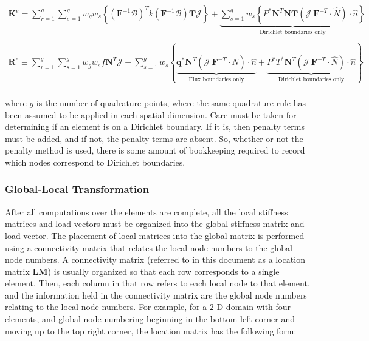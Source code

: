 \documentclass[10pt]{article}
\begin{document}
\begin{equation}
\label{eq:FEWeakForm_element3}
\begin{aligned}
\textbf{K}^e=\sum_{r=1}^g\sum_{s=1}^gw_gw_s\left\{(\textbf{F}^{-1}\mathscr{B})^Tk(\textbf{F}^{-1}\mathscr{B})\textbf{T} \mathscr{J}\right\} +\underbrace{\sum_{s=1}^gw_s\left\{P^{*}\textbf{N}^T\textbf{N}\textbf{T}(\mathscr{J}\ \textbf{F}^{-T}\cdot\hat{N})\cdot\hat{n}\right\}}_\text{Dirichlet boundaries only}\\
\ \\
\textbf{R}^e\equiv\sum_{r=1}^g\sum_{s=1}^gw_gw_sf\textbf{N}^T \mathscr{J}+\sum_{s=1}^gw_s\left\{\underbrace{\textbf{q}^{*}\textbf{N}^T (\mathscr{J}\ \textbf{F}^{-T}\cdot\hat{N})\cdot\hat{n}}_\text{Flux boundaries only}+\underbrace{P^{*}T^{*}\textbf{N}^T (\mathscr{J}\ \textbf{F}^{-T}\cdot\hat{N})\cdot\hat{n}}_\text{Dirichlet boundaries only}\right\}\\
\end{aligned}
\end{equation}

where \(g\) is the number of quadrature points, where the same quadrature rule has been assumed to be applied in each spatial dimension. Care must be taken for determining if an element is on a Dirichlet boundary. If it is, then penalty terms must be added, and if not, the penalty terms are absent. So, whether or not the penalty method is used, there is some amount of bookkeeping required to record which nodes correspond to Dirichlet boundaries.

\subsubsection{Global-Local Transformation}

After all computations over the elements are complete, all the local stiffness matrices and load vectors must be organized into the global stiffness matrix and load vector. The placement of local matrices into the global matrix is performed using a connectivity matrix that relates the local node numbers to the global node numbers. A connectivity matrix (referred to in this document as a location matrix \textbf{LM}) is usually organized so that each row corresponds to a single element. Then, each column in that row refers to each local node to that element, and the information held in the connectivity matrix are the global node numbers relating to the local node numbers. For example, for a 2-D domain with four elements, and global node numbering beginning in the bottom left corner and moving up to the top right corner, the location matrix has the following form:
\end{document}
